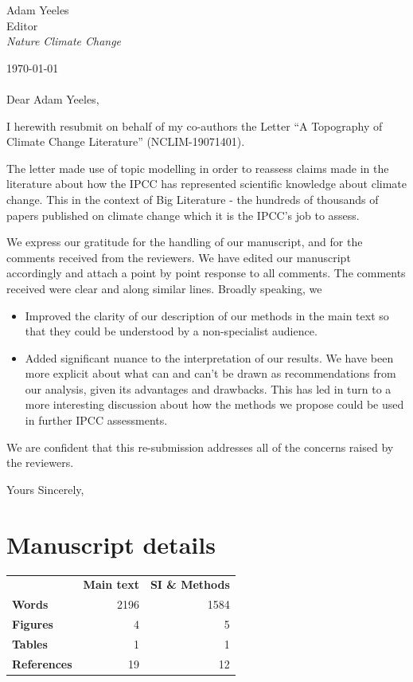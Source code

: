 \documentclass{letter}
\begin{document}
\begin{letter}{Adam Yeeles \\ Editor \\ \textit{Nature Climate Change}}
		\date{}
		
		


   \opening{\today \\ \\ Dear Adam Yeeles,}

   I herewith resubmit on behalf of my co-authors the Letter ``A Topography of Climate Change Literature'' (NCLIM-19071401).
   
   The letter made use of topic modelling in order to reassess claims made in the literature about how the IPCC has represented scientific knowledge about climate change. This in the context of Big Literature - the hundreds of thousands of papers published on climate change which it is the IPCC's job to assess. 
   
   We express our gratitude for the handling of our manuscript, and for the comments received from the reviewers. We have edited our manuscript accordingly and attach a point by point response to all comments.
   The comments received were clear and along similar lines. Broadly speaking, we 
   \begin{itemize}
   	\item Improved the clarity of our description of our methods in the main text so that they could be understood by a non-specialist audience.
   	\item Added significant nuance to the interpretation of our results. We have been more explicit about what can and can't be drawn as recommendations from our analysis, given its advantages and drawbacks. This has led in turn to a more interesting discussion about how the methods we propose could be used in further IPCC assessments.
   \end{itemize}

	We are confident that this re-submission addresses all of the concerns raised by the reviewers.

\closing{Yours Sincerely,}


\section{Manuscript details}

\begin{tabular}{l r r}
	
	 & \textbf{Main text} & \textbf{SI \& Methods} \\
	 \textbf{Words} & 2196 & 1584 \\
	 \textbf{Figures} & 4 & 5 \\
	 \textbf{Tables} & 1 & 1 \\
	 \textbf{References} & 19 & 12
	 
	
\end{tabular} 
%
%

\end{letter}
\end{document}
